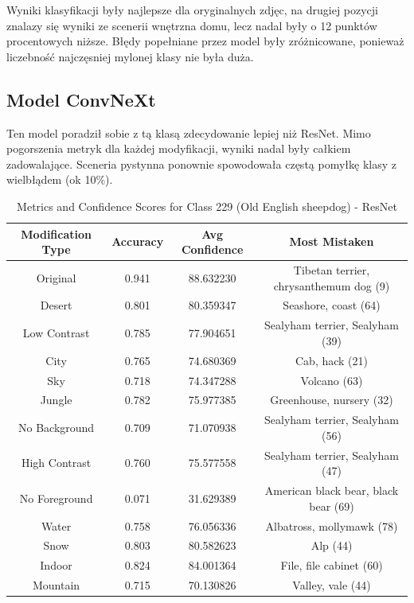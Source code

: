 Wyniki klasyfikacji były najlepsze dla oryginalnych zdjęc, na drugiej pozycji znalazy się wyniki ze scenerii wnętrzna domu, lecz nadal były o 12 punktów procentowych niższe. Błędy popełniane przez model były zróżnicowane, ponieważ liczebność najczęsniej mylonej klasy nie była duża.


\subsection*{Model ConvNeXt}

Ten model poradził sobie z tą klasą zdecydowanie lepiej niż ResNet. Mimo pogorszenia metryk dla każdej modyfikacji, wyniki nadal były całkiem zadowalające. Sceneria pystynna ponownie spowodowała częstą pomyłkę klasy z wielbłądem (ok 10\%).

\begin{table}
	\centering
	\begin{tabular}{|c|c|c|c|}
		\hline
		\textbf{Modification Type} & \textbf{Accuracy} & \textbf{Avg Confidence} & \textbf{Most Mistaken} \\
		\hline
		Original & 0.941 & 88.632230 & Tibetan terrier, chrysanthemum dog (9) \\
		\hline
		Desert & 0.801 & 80.359347 & Seashore, coast (64) \\
		\hline
		Low Contrast & 0.785 & 77.904651 & Sealyham terrier, Sealyham (39) \\
		\hline
		City & 0.765 & 74.680369 & Cab, hack (21) \\
		\hline
		Sky & 0.718 & 74.347288 & Volcano (63) \\
		\hline
		Jungle & 0.782 & 75.977385 & Greenhouse, nursery (32) \\
		\hline
		No Background & 0.709 & 71.070938 & Sealyham terrier, Sealyham (56) \\
		\hline
		High Contrast & 0.760 & 75.577558 & Sealyham terrier, Sealyham (47) \\
		\hline
		No Foreground & 0.071 & 31.629389 & American black bear, black bear (69) \\
		\hline
		Water & 0.758 & 76.056336 & Albatross, mollymawk (78) \\
		\hline
		Snow & 0.803 & 80.582623 & Alp (44) \\
		\hline
		Indoor & 0.824 & 84.001364 & File, file cabinet (60) \\
		\hline
		Mountain & 0.715 & 70.130826 & Valley, vale (44) \\
		\hline
	\end{tabular}
	\caption{Metrics and Confidence Scores for Class 229 (Old English sheepdog) - ResNet}
	\label{tab:metrics_confidence_class_229_resnet}
\end{table}

